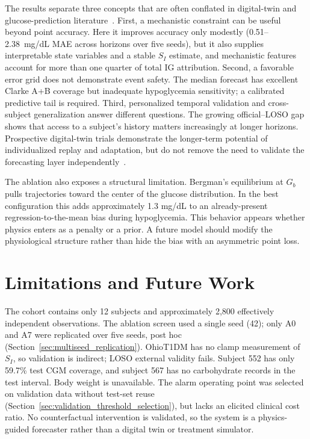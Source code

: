 \documentclass[journal]{IEEEtran}
\begin{document}
The results separate three concepts that are often conflated in digital-twin and glucose-prediction literature~\cite{ref2}. First, a mechanistic constraint can be useful beyond point accuracy. Here it improves accuracy only modestly (0.51--2.38~mg/dL MAE across horizons over five seeds), but it also supplies interpretable state variables and a stable $S_I$ estimate, and mechanistic features account for more than one quarter of total IG attribution. Second, a favorable error grid does not demonstrate event safety. The median forecast has excellent Clarke A+B coverage but inadequate hypoglycemia sensitivity; a calibrated predictive tail is required. Third, personalized temporal validation and cross-subject generalization answer different questions. The growing official--LOSO gap shows that access to a subject's history matters increasingly at longer horizons. Prospective digital-twin trials demonstrate the longer-term potential of individualized replay and adaptation, but do not remove the need to validate the forecasting layer independently~\cite{ref18}.

The ablation also exposes a structural limitation. Bergman's equilibrium at $G_b$ pulls trajectories toward the center of the glucose distribution. In the best configuration this adds approximately 1.3 mg/dL to an already-present regression-to-the-mean bias during hypoglycemia. This behavior appears whether physics enters as a penalty or a prior. A future model should modify the physiological structure rather than hide the bias with an asymmetric point loss.

\section{Limitations and Future Work}

The cohort contains only 12 subjects and approximately 2,800 effectively independent observations. The ablation screen used a single seed (42); only A0 and A7 were replicated over five seeds, post hoc (Section~\ref{sec:multiseed_replication}). OhioT1DM has no clamp measurement of $S_I$, so validation is indirect; LOSO external validity fails. Subject 552 has only 59.7\% test CGM coverage, and subject 567 has no carbohydrate records in the test interval. Body weight is unavailable. The alarm operating point was selected on validation data without test-set reuse (Section~\ref{sec:validation_threshold_selection}), but lacks an elicited clinical cost ratio. No counterfactual intervention is validated, so the system is a physics-guided forecaster rather than a digital twin or treatment simulator.
\end{document}
